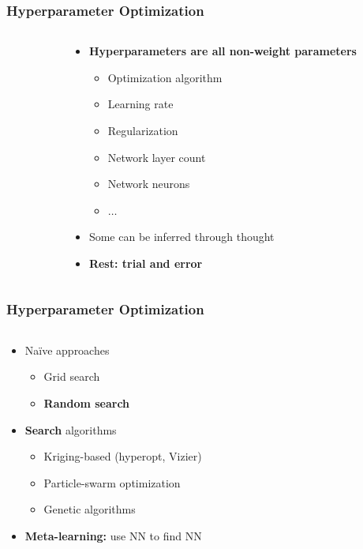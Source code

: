 \documentclass[aspectratio=169]{beamer}
\begin{document}
\begin{frame}
\frametitle{Hyperparameter Optimization}

\begin{columns}
    \begin{column}{0.48\textwidth}
    \end{column}
    \begin{column}{0.48\textwidth}
        \begin{itemize}
            \item \textbf{Hyperparameters are all non-weight parameters}
            \begin{itemize}
                \item Optimization algorithm
                \item Learning rate
                \item Regularization
                \item Network layer count
                \item Network neurons
                \item $\dots$
            \end{itemize}
            \item Some can be inferred through thought
            \item \textbf{Rest: trial and error}
        \end{itemize}
    \end{column}
\end{columns}
\end{frame}

\begin{frame}
\frametitle{Hyperparameter Optimization}

\begin{columns}
    \begin{column}{0.48\textwidth}
        \begin{itemize}
            \item Naïve approaches
            \begin{itemize}
                \item Grid search
                \item \textbf{Random search}
            \end{itemize}
            \item \textbf{Search} algorithms
            \begin{itemize}
                \item Kriging-based (hyperopt, Vizier)
                \item Particle-swarm optimization
                \item Genetic algorithms
            \end{itemize}
            \item \textbf{Meta-learning:} use NN to find NN
        \end{itemize}
    \end{column}
    \begin{column}{0.48\textwidth}
    \end{column}
\end{columns}
\end{frame}
\end{document}
